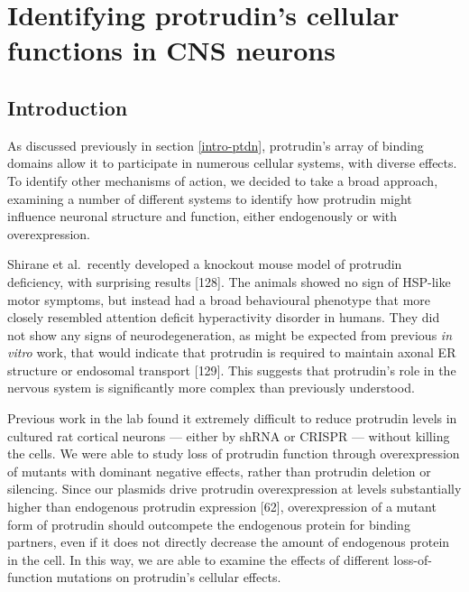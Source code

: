\documentclass[
  12pt,
  a4paper,
]{book}
\renewcommand{\chaptermark}[1]{\markboth{#1}{}}
\begin{document}
\chapter{Identifying protrudin's cellular functions in CNS neurons}\label{identifying-protrudins-cellular-functions-in-cns-neurons}

\chaptermark{Cellular functions of protrudin}

\section{Introduction}\label{introduction-1}

As discussed previously in section \ref{intro-ptdn}, protrudin's array of binding domains allow it to participate in numerous cellular systems, with diverse effects. To identify other mechanisms of action, we decided to take a broad approach, examining a number of different systems to identify how protrudin might influence neuronal structure and function, either endogenously or with overexpression.

Shirane et al.~recently developed a knockout mouse model of protrudin deficiency, with surprising results {[}128{]}. The animals showed no sign of HSP-like motor symptoms, but instead had a broad behavioural phenotype that more closely resembled attention deficit hyperactivity disorder in humans. They did not show any signs of neurodegeneration, as might be expected from previous \emph{in vitro} work, that would indicate that protrudin is required to maintain axonal ER structure or endosomal transport {[}129{]}. This suggests that protrudin's role in the nervous system is significantly more complex than previously understood.

Previous work in the lab found it extremely difficult to reduce protrudin levels in cultured rat cortical neurons --- either by shRNA or CRISPR --- without killing the cells. We were able to study loss of protrudin function through overexpression of mutants with dominant negative effects, rather than protrudin deletion or silencing. Since our plasmids drive protrudin overexpression at levels substantially higher than endogenous protrudin expression {[}62{]}, overexpression of a mutant form of protrudin should outcompete the endogenous protein for binding partners, even if it does not directly decrease the amount of endogenous protein in the cell. In this way, we are able to examine the effects of different loss-of-function mutations on protrudin's cellular effects.
\end{document}
